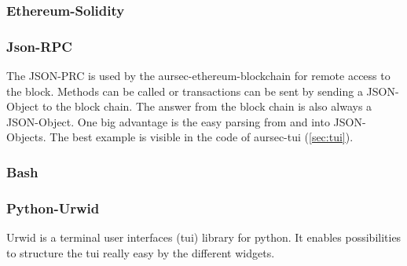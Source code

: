 
\subsubsection*{Ethereum-Solidity}
\subsubsection*{Json-RPC}
The JSON-PRC is used by the aursec-ethereum-blockchain for remote access to the block. Methods can be called or transactions can be sent by sending a JSON-Object to the block chain. The answer from the block chain is also always a JSON-Object. One big advantage is the easy parsing from and into JSON-Objects. The best example is visible in the code of aursec-tui (\ref{sec:tui}).
\subsubsection*{Bash}
\subsubsection*{Python-Urwid}
Urwid is a terminal user interfaces (tui) library for python. It enables possibilities to structure the tui really easy by the different widgets. 

